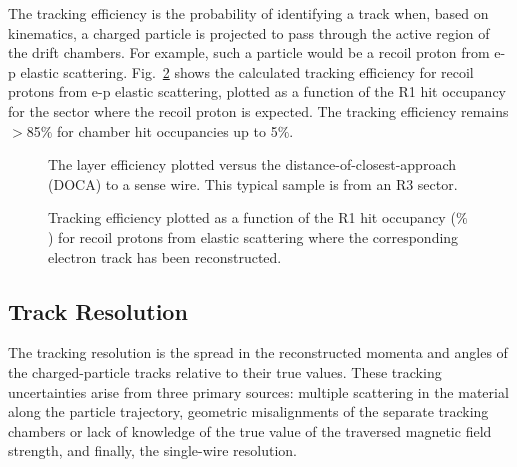 The tracking efficiency is the probability of identifying a 
track when, based on kinematics, a charged particle is projected to pass through the 
active region of the drift chambers.  For example, such a particle would be a recoil
proton from e-p elastic scattering.
Fig.~\ref{trkeff} shows the calculated tracking efficiency for recoil protons from
e-p elastic scattering, plotted as a function of the R1 hit occupancy for the sector 
where the recoil proton is expected.  The tracking efficiency remains $>$85$\%$ for 
chamber hit occupancies up to 5$\%$.  

\vfil
\eject

\begin{figure}[htpb]
\vspace{5.0cm} 
\caption{\small{The layer efficiency plotted versus the distance-of-closest-approach
(DOCA) to a sense wire.  This typical sample is from an R3 sector.}}
\label{edoca}
\end{figure}

\begin{figure}[htpb]
\vspace{6.3cm} 
\caption{\small{Tracking efficiency plotted as a function of the R1 hit
occupancy ($\%$) for recoil protons from elastic scattering where the
corresponding electron track has been reconstructed.}}
\label{trkeff}
\end{figure}

\subsection{Track Resolution}

\hskip 0.15in
The tracking resolution is the spread in the reconstructed
momenta and angles of the charged-particle tracks relative to their true values.
These tracking uncertainties arise from three primary sources: multiple scattering 
in the material along the particle trajectory, geometric misalignments of the separate 
tracking chambers or lack of knowledge 
of the true value of the traversed magnetic field strength, and finally, the  
single-wire resolution.  

